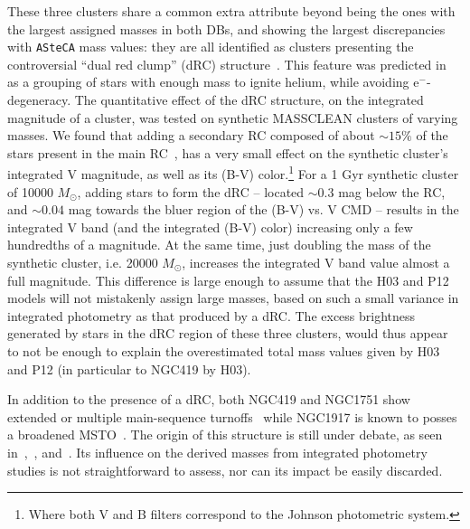 \documentclass{aa}
\begin{document}
These three clusters share a common extra attribute beyond being the ones with
the largest assigned masses in both DBs, and showing the largest discrepancies
with \texttt{ASteCA} mass values: they are all identified as clusters
presenting the controversial ``dual red clump'' (dRC) structure~\citep
{Girardi_2009}.
This feature was predicted in~\cite{Girardi_1998} as a grouping of stars with
enough mass to ignite helium, while avoiding e$^-$-degeneracy.
%
%
%
The quantitative effect of the dRC structure, on the integrated magnitude of a
cluster, was tested on synthetic MASSCLEAN clusters of varying masses. We found
that adding a secondary RC composed of about ${\sim}15\%$ of the stars present
in the main RC~\citep[the approximate value found for NGC419 in][]
{Girardi_2009}, has a very small effect on the synthetic cluster's integrated V
magnitude, as well as its (B-V) color.\footnote{Where both V and B filters
correspond to the Johnson photometric system.}
%
For a 1 Gyr synthetic cluster of 10000 $M_{\odot}$, adding stars
to form the dRC -- located ${\sim}0.3$ mag below the RC, and
${\sim}0.04$ mag towards the bluer region of the (B-V) vs. V CMD -- results
in the integrated V band (and the integrated (B-V) color) increasing only
a few hundredths of a magnitude.
At the same time, just doubling the mass of the synthetic cluster, i.e.
20000 $M_{\odot}$, increases the integrated V band value almost a full
magnitude. This difference is large enough to assume that the H03 and P12
models will not mistakenly assign large masses, based on such a small variance
in integrated photometry as that produced by a dRC.\@
%
The excess brightness generated by stars in the dRC region of these three
clusters, would thus appear to not be enough to explain the overestimated total
mass values given by H03 and P12 (in particular to NGC419 by H03).

In addition to the presence of a dRC, both NGC419 and NGC1751 show
extended or multiple main-sequence turnoffs~\citep[MSTO; see:][]
{Glatt_2008,Milone_2009,Rubele_2010,Rubele_2011,Girardi_2011}
while NGC1917 is known to posses a broadened MSTO~\citep{Milone_2009}.
The origin of this structure is still under debate, as seen in~\cite
{Piatti_Bastian_2016},~\cite{Milone_2016}, and~\cite{Li_2016}.
Its influence on the derived masses from integrated photometry studies is not
straightforward to assess, nor can its impact be easily discarded.\\
\end{document}
